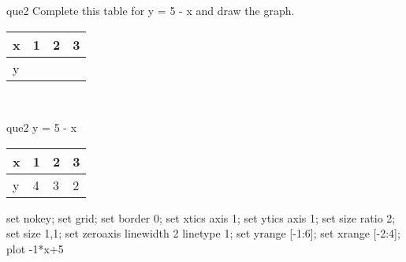 \documentclass[13.5pt, varwidth=true]{beamer}
\begin{document}
\begin{frame}[shrink=19,fragile]
	\begin{beamercolorbox}[rounded=true, left, shadow=true,wd=14.8cm]{que2}
		 Complete this table for y = 5 - x and draw the graph. \\[0.3cm] \renewcommand{\arraystretch}{1.2}\begin{tabular}{|C|C|C|C|} \hline x & 1 & 2 & 3 \\ \hline y & & & \\ \hline \end{tabular}\\[0.3cm]
	\end{beamercolorbox}
\end{frame}
\begin{frame}[shrink=19,fragile]
	\begin{beamercolorbox}[rounded=true, left, shadow=true,wd=14.8cm]{que2}
		y = 5 - x\renewcommand{\arraystretch}{1.2}\begin{tabular}{|C|C|C|C|} \hline x & 1 & 2 & 3 \\ \hline y & 4 & 3 & 2\\ \hline \end{tabular}\begin{gnuplot}[terminal=pdf] set nokey; set grid; set border 0; set xtics axis 1; set ytics axis 1; set size ratio 2; set size 1,1; set zeroaxis linewidth 2 linetype 1; set yrange [-1:6]; set xrange [-2:4]; plot -1*x+5 \end{gnuplot}
	\end{beamercolorbox}
\end{frame}
\end{document}
